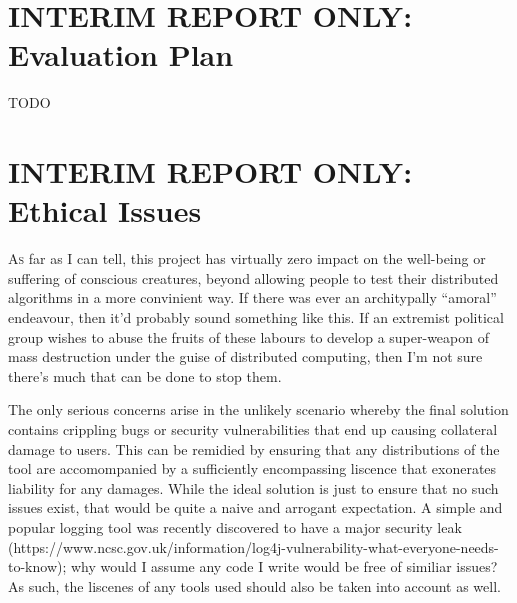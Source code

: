 \section{INTERIM REPORT ONLY: Evaluation Plan}

TODO


\section{INTERIM REPORT ONLY: Ethical Issues}

\lettrine{A}{s} far as I can tell, this project has virtually zero impact on the well-being or suffering of conscious
creatures, beyond allowing people to test their distributed algorithms in a more convinient way. If there was ever an
architypally ``amoral'' endeavour, then it'd probably sound something like this. If an extremist political group
wishes to abuse the fruits of these labours to develop a super-weapon of mass destruction under the guise of
distributed computing, then I'm not sure there's much that can be done to stop them.

The only serious concerns arise in the unlikely scenario whereby the final solution contains crippling bugs or security
vulnerabilities that end up causing collateral damage to users. This can be remidied by ensuring that any
distributions of the tool are accomompanied by a sufficiently encompassing liscence that exonerates liability for any
damages. While the ideal solution is just to ensure that no such issues exist, that would be quite a naive and
arrogant expectation. A simple and popular logging tool was recently discovered to have a major security leak
(https://www.ncsc.gov.uk/information/log4j-vulnerability-what-everyone-needs-to-know); why would I assume any code I
write would be free of similiar issues? As such, the liscenes of any tools used should also be taken into account as
well.
